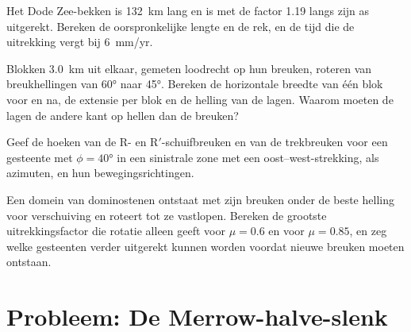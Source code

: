 \begin{exercise}[$\star\star$]\label{exo:b3:extension-strike-slip:9}
Het Dode Zee-bekken is \qty{132}{km} lang en is met de factor 1.19
langs zijn as uitgerekt. Bereken de oorspronkelijke lengte en de rek, en de tijd
die de uitrekking vergt bij \qty{6}{mm/yr}.
\end{exercise}

\begin{exercise}[$\star\star\star$]\label{exo:b3:extension-strike-slip:10}
Blokken \qty{3.0}{km} uit elkaar, gemeten loodrecht op hun breuken, roteren van
breukhellingen van \ang{60} naar \ang{45}. Bereken de horizontale breedte van één
blok voor en na, de extensie per blok en de helling van de lagen.
Waarom moeten de lagen de andere kant op hellen dan de breuken?
\end{exercise}

\begin{exercise}[$\star\star\star$]\label{exo:b3:extension-strike-slip:11}
Geef de hoeken van de R- en R$'$-schuifbreuken en van de trekbreuken voor een
gesteente met $\phi = \ang{40}$ in een sinistrale zone met een oost--west-strekking, als
azimuten, en hun bewegingsrichtingen.
\end{exercise}

\begin{exercise}[$\star\star\star$]\label{exo:b3:extension-strike-slip:12}
Een domein van dominostenen ontstaat met zijn breuken onder de beste helling voor
verschuiving en roteert tot ze vastlopen. Bereken de grootste uitrekkingsfactor die
rotatie alleen geeft voor $\mu = 0.6$ en voor $\mu = 0.85$, en zeg welke
gesteenten verder uitgerekt kunnen worden voordat nieuwe breuken moeten ontstaan.
\end{exercise}

\section{Probleem: De Merrow-halve-slenk}

